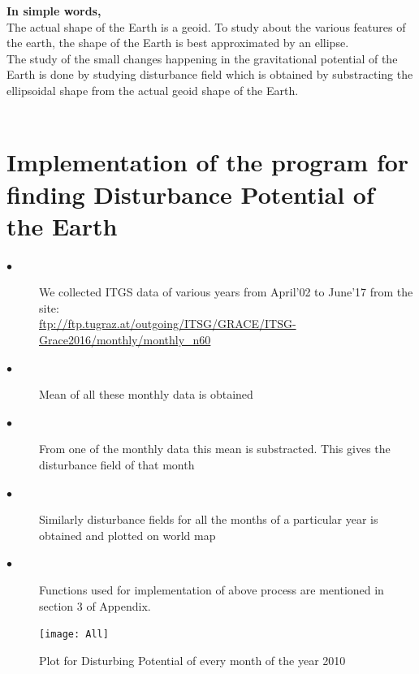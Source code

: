 \documentclass[a4paper,12pt]{report}
\begin{document}
\textbf{In simple words,}
\\The actual shape of the Earth is a geoid. To study about the various features of the earth, the shape of the Earth is best approximated by an ellipse.
\\The study of the small changes happening in the gravitational potential of the Earth is done by studying disturbance field which is obtained by substracting the ellipsoidal shape from the actual geoid shape of the Earth.\\\\


\section{Implementation of the program for finding Disturbance Potential of the Earth}
\begin{description}
\item[$\bullet$]We collected ITGS data of various years from April'02 to June'17 from the site:\\
\url{ftp://ftp.tugraz.at/outgoing/ITSG/GRACE/ITSG-Grace2016/monthly/monthly_n60}
\item[$\bullet$]Mean of all these monthly data is obtained
\item[$\bullet$]From one of the monthly data this mean is substracted. This gives the disturbance field of that month
\item[$\bullet$]Similarly disturbance fields for all the months of a particular year is obtained and plotted on world map
\item[$\bullet$]Functions used for implementation of above process are mentioned in section 3 of Appendix.
\end{description}


\begin{figure}
    \advance\leftskip-3cm
    \texttt{[image: All]}
    \caption{Plot for Disturbing Potential of every month of the year 2010}
\end{figure}
\end{document}
